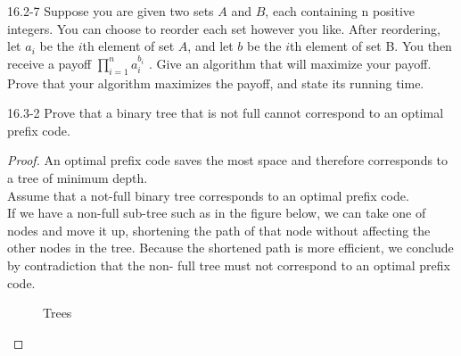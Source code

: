 \begin{problem}{16.2-7}
  Suppose you are given two sets $A$ and $B$, each containing n positive integers. You can choose to reorder each set
however you like. After reordering, let $a_i$ be the $i$th element of set $A$, and let $b$ be the $i$th element of set
B. You then receive a payoff $\displaystyle\prod\limits_{i = 1}^n a_i^{b_i}$ . Give an algorithm that will maximize your
   payoff. Prove that your algorithm maximizes the payoff, and state its running time.
\end{problem}

\begin{problem}{16.3-2}
  Prove that a binary tree that is not full cannot correspond to an optimal prefix code.
  \begin{solution}
    \begin{proof}
      An optimal prefix code saves the most space and therefore corresponds to a tree of minimum depth. \\ Assume that a
      not-full binary tree corresponds to an optimal prefix code. \\ If we have a non-full sub-tree such as in the
      figure below, we can take one of nodes and move it up, shortening the path of that node without affecting the
      other nodes in the tree. Because the shortened path is more efficient, we conclude by contradiction that the non-
      full tree must not correspond to an optimal prefix code. \qedhere
      \begin{figure}[H]
        \centering
        \caption{Trees}

\end{figure}
\end{proof}
\end{solution}
\end{problem}
